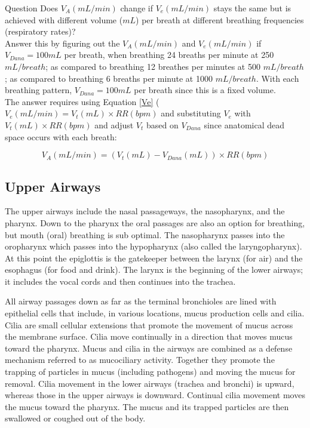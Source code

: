 \begin{question}{Question}
    Does $V_A (mL/min)$ change if $V_e (mL/min)$ stays the same but is achieved with different volume ($mL$) per breath at different breathing frequencies (respiratory rates)? 
    \vspace{0.2cm}
    \\Answer this by figuring out the $V_A (mL/min)$ and $V_e (mL/min)$ if $V_{Dana} = 100 mL$ per breath, when breathing 24 breaths per minute at 250 $mL/breath$; as compared to breathing 12 breathes per minutes at 500 $mL/breath$; as compared to breathing 6 breaths per minute at 1000 $mL/breath$. With each breathing pattern, $V_{Dana} = 100 mL$ per breath since this is a fixed volume.\\
    \vspace{0.2cm}
    The answer requires using Equation \ref{Ve} ($V_e (mL/min) = V_t (mL) \times RR (bpm)$ and substituting $V_e$ with $V_t (mL) \times RR (bpm)$ and adjust $V_t$ based on $V_{Dana}$ since anatomical dead space occurs with each breath:

\begin{equation}
    V_A (mL/min) = (V_t (mL) - V_{Dana}(mL)) \times RR (bpm)
\end{equation}

\end{question}


\subsection{Upper Airways}

The upper airways include the nasal passageways, the nasopharynx, and the pharynx. Down to the pharynx the oral passages are also an option for breathing, but mouth (oral) breathing is sub optimal. The nasopharynx passes into the oropharynx which passes into the hypopharynx (also called the laryngopharynx). At this point the epiglottis is the gatekeeper between the larynx (for air) and the esophagus (for food and drink).  The larynx is the beginning of the lower airways; it includes the vocal cords and then continues into the trachea. 

All airway passages down as far as the terminal bronchioles are lined with epithelial cells that include, in various locations, mucus production cells and cilia. Cilia are small cellular extensions that promote the movement of mucus across the membrane surface. Cilia move continually in a direction that moves mucus toward the pharynx. Mucus and cilia in the airways are combined as a defense mechanism referred to as mucociliary activity. Together they promote the trapping of particles in mucus (including pathogens) and moving the mucus for removal. Cilia movement in the lower airways (trachea and bronchi) is upward, whereas those in the upper airways is downward. Continual cilia movement moves the mucus toward the pharynx. The mucus and its trapped particles are then swallowed or coughed out of the body.

